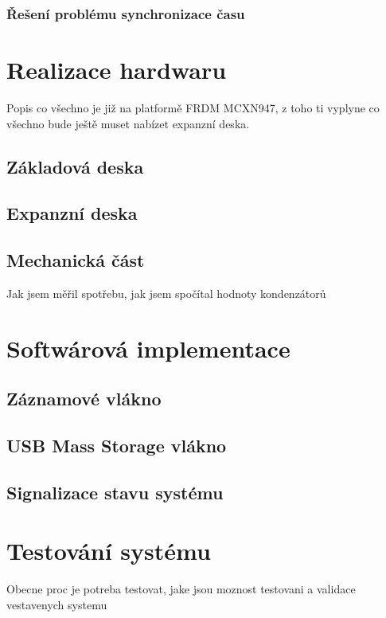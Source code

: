 
\subsection{Řešení problému synchronizace času}


\chapter{Realizace hardwaru}
Popis co všechno je již na platformě FRDM MCXN947, z toho ti vyplyne co všechno bude ještě muset nabízet expanzní deska.
\section{Základová deska}
\section{Expanzní deska}

\section{Mechanická část}
Jak jsem měřil spotřebu, jak jsem spočítal hodnoty kondenzátorů

\chapter{Softwárová implementace}

\section{Záznamové vlákno}

\section{USB Mass Storage vlákno}

\section{Signalizace stavu systému}

\chapter{Testování systému}
Obecne proc je potreba testovat, jake jsou moznost testovani a validace vestavenych systemu

